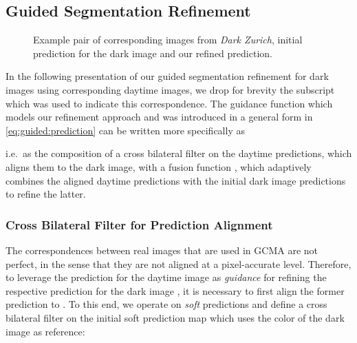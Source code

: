 \documentclass[10pt,twocolumn,letterpaper]{article}
\begin{document}
\subsection{Guided Segmentation Refinement}
\label{sec:gcma:guidance}

\begin{figure*}
    \centering
    \label{fig:refinement:twilight}
    \hfil
    \label{fig:refinement:day}
    \hfil
    \label{fig:refinement:init}
    \hfil
    \label{fig:refinement:ours}
    \caption{Example pair of corresponding images from \emph{Dark Zurich}, initial prediction for the dark image and our refined prediction.}
    \label{fig:refinement}
\end{figure*}

In the following presentation of our guided segmentation refinement for dark images using corresponding daytime images, we drop for brevity the subscript which was used to indicate this correspondence. The guidance function  which models our refinement approach and was introduced in a  general form in \eqref{eq:guided:prediction} can be written more specifically as

i.e.\ as the composition of a cross bilateral filter  on the daytime predictions, which aligns them to the dark image, with a fusion function , which adaptively combines the aligned daytime predictions with the initial dark image predictions to refine the latter.

\subsubsection{Cross Bilateral Filter for Prediction Alignment}
\label{sec:gcma:guidance:bilateral}

The correspondences between real images that are used in GCMA are not perfect, in the sense that they are not aligned at a pixel-accurate level. Therefore, to leverage the prediction for the daytime image  as \emph{guidance} for refining the respective prediction for the dark image , it is necessary to first align the former prediction to . To this end, we operate on \emph{soft} predictions and define a cross bilateral filter on the initial soft prediction map  which uses the color of the dark image  as reference:
\end{document}
